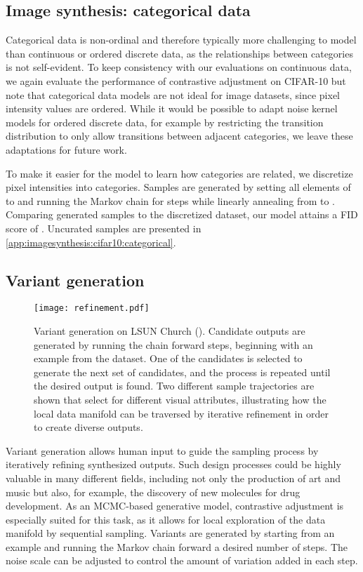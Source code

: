 \documentclass[10pt,twocolumn,letterpaper]{article}
\begin{document}
\subsection{Image synthesis: categorical data}

Categorical data is non-ordinal and therefore typically more challenging to model than continuous or ordered discrete data, as the relationships between categories is not self-evident.
To keep consistency with our evaluations on continuous data, we again evaluate the performance of contrastive adjustment on CIFAR-10 but note that categorical data models are not ideal for image datasets, since pixel intensity values are ordered.
While it would be possible to adapt noise kernel models for ordered discrete data, for example by restricting the transition distribution to only allow transitions between adjacent categories, we leave these adaptations for future work.

To make it easier for the model to learn how categories are related, we discretize pixel intensities into  categories.
Samples are generated by setting all elements of  to  and running the Markov chain for  steps while linearly annealing  from  to .
Comparing generated samples to the discretized dataset, our model attains a FID score of .
Uncurated samples are presented in \cref{app:imagesynthesis:cifar10:categorical}.


\subsection{Variant generation}

\begin{figure*}[t]
  \centering
  \texttt{[image: refinement.pdf]}\caption{Variant generation on LSUN Church ().
    Candidate outputs are generated by running the chain forward  steps, beginning with an example from the dataset.
    One of the candidates is selected to generate the next set of candidates, and the process is repeated until the desired output is found.
    Two different sample trajectories are shown that select for different visual attributes, illustrating how the local data manifold can be traversed by iterative refinement in order to create diverse outputs.
  }\label{fig:variants}
\end{figure*}

Variant generation allows human input to guide the sampling process by iteratively refining synthesized outputs.
Such design processes could be highly valuable in many different fields, including not only the production of art and music but also, for example, the discovery of new molecules for drug development.
As an MCMC-based generative model, contrastive adjustment is especially suited for this task, as it allows for local exploration of the data manifold by sequential sampling.
Variants are generated by starting from an example  and running the Markov chain forward a desired number of steps.
The noise scale  can be adjusted to control the amount of variation added in each step.
\end{document}

